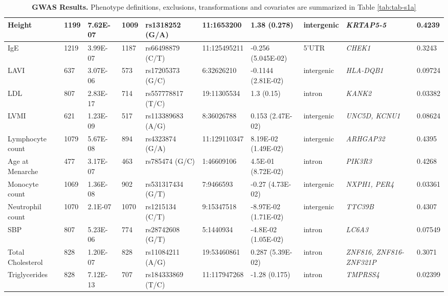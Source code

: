 \begin{landscape}
\begin{table}
\begin{adjustbox}{width={\textwidth}}
\begin{tabular}{@{}p{2cm}|p{2.5cm}p{4cm}p{3cm}p{2cm}p{3cm}p{2.1cm}p{1.5cm}p{3cm}p{2cm}@{}}
Height & 1199 & 7.62E-07	 & 1009 & rs1318252 (G/A) & 11:1653200 & 1.38         (0.278) & intergenic & \emph{KRTAP5-5} & 0.4239\\ \hline

IgE & 1219 & 3.99E-07 & 1187 & rs66498879 (C/T) & 11:125495211 & -0.256        (5.045E-02) & 5\rq UTR & \emph{CHEK1} & 0.3243\\ \hline

LAVI & 637 & 3.07E-06 & 573 & rs17205373 (G/C) & 6:32626210 & -0.1144        (2.81E-02) & intergenic & \emph{HLA-DQB1} & 0.09724\\ \hline

LDL & 807 & 2.83E-17 & 714 & rs557778817 (T/C) & 19:11305534 & 1.3         (0.15) & intron & \emph{KANK2} & 0.03382\\ \hline

LVMI	 & 621 & 1.23E-09 & 517 & rs113389683 (A/G) & 8:36026788 & 0.153      (2.47E-02) & intergenic & \emph{UNC5D, KCNU1} & 0.08624\\ \hline

Lymphocyte count & 1079 & 5.67E-08 & 894 & rs4323874 (G/A) & 11:129110347 & 8.19E-02 (1.49E-02) & intergenic & \emph{ARHGAP32} & 0.4395\\ \hline
Age at Menarche & 477 & 3.17E-07 & 463 & rs785474 (G/C) & 1:46609106 & 4.5E-01 (8.72E-02) & intron & \emph{PIK3R3} & 0.4268\\ \hline
Monocyte count & 1069 & 1.36E-08 & 902 & rs531317434 (G/T) & 7:9466593 & -0.27 (4.73E-02) & intergenic & \emph{NXPH1, PER4} & 0.03361\\ \hline
Neutrophil count & 1070 & 2.1E-07 & 1070 & rs1215134 (C/T) & 9:15347518 & -8.97E-02 (1.71E-02) & intergenic & \emph{TTC39B} & 0.4307\\ \hline

SBP & 807 & 5.23E-06 & 774 & rs28742608 (G/T) & 5:1440934 & -4.8E-02 (1.05E-02) & intron & \emph{LC6A3} & 0.07549\\ \hline

Total Cholesterol & 828 & 1.20E-07 & 828 & rs11084211 (A/G) & 19:53460861 & 0.287 (5.39E-02) & intron & \emph{ZNF816, ZNF816-ZNF321P} & 0.3071\\ \hline

Triglycerides & 828 & 7.12E-13	 & 707 & rs184333869 (T/C) & 11:117947268 & -1.28 (0.175) & intron & \emph{TMPRSS4} & 0.02399\\ \bottomrule

\end{tabular}
\end{adjustbox}
\caption[GWAS Results. ]{\textbf{GWAS Results.} Phenotype definitions, exclusions, transformations and covariates are summarized in Table \ref{tab:tab-s1a}}
\label{tab:tab-s2}
\end{table}

\end{landscape}




